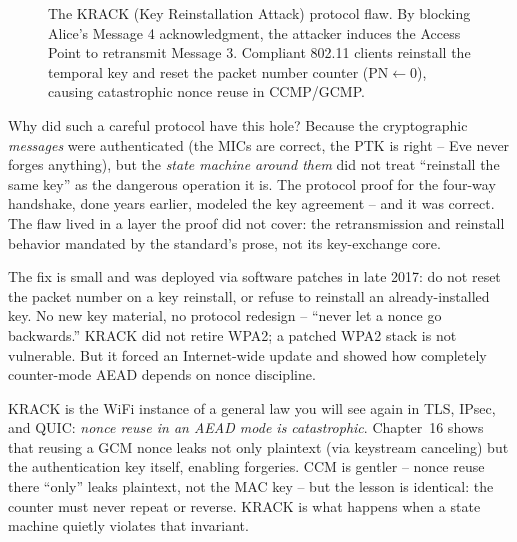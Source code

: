 \begin{figure}[H]
\caption{The KRACK (Key Reinstallation Attack) protocol flaw. By blocking Alice's Message 4 acknowledgment,
the attacker induces the Access Point to retransmit Message 3. Compliant 802.11 clients reinstall the
temporal key and reset the packet number counter ($\text{PN} \leftarrow 0$), causing catastrophic nonce reuse in CCMP/GCMP.}
\label{ch26:fig-krack}
\end{figure}

\begin{whybox}
Why did such a careful protocol have this hole? Because the cryptographic
\emph{messages} were authenticated (the MICs are correct, the PTK is right -- Eve
never forges anything), but the \emph{state machine around them} did not treat
``reinstall the same key'' as the dangerous operation it is. The protocol proof for
the four-way handshake, done years earlier, modeled the key agreement -- and it was
correct. The flaw lived in a layer the proof did not cover: the retransmission and
reinstall behavior mandated by the standard's prose, not its key-exchange core.

The fix is small and was deployed via software patches in late 2017: do not reset
the packet number on a key reinstall, or refuse to reinstall an already-installed
key. No new key material, no protocol redesign -- ``never let a nonce go
backwards.'' KRACK did not retire WPA2; a patched WPA2 stack is not vulnerable.
But it forced an Internet-wide update and showed how completely counter-mode
AEAD depends on nonce discipline.
\end{whybox}

\begin{connectionbox}
KRACK is the WiFi instance of a general law you will see again in TLS, IPsec, and
QUIC: \emph{nonce reuse in an AEAD mode is catastrophic}. Chapter~16
shows that reusing a GCM nonce leaks not only plaintext (via keystream canceling)
but the authentication key itself, enabling forgeries. CCM is gentler -- nonce
reuse there ``only'' leaks plaintext, not the MAC key -- but the lesson is
identical: the counter must never repeat or reverse. KRACK is what happens when a
state machine quietly violates that invariant.
\end{connectionbox}

